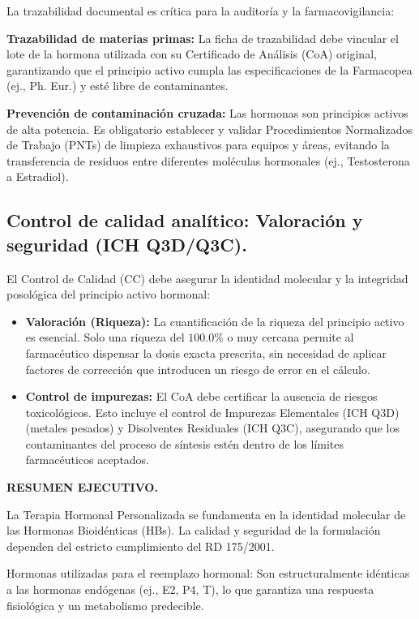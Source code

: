 \documentclass[
  spanish,
]{article}
\providecommand{\tightlist}{%
  \setlength{\itemsep}{0pt}\setlength{\parskip}{0pt}}
\begin{document}
La trazabilidad documental es crítica para la auditoría y la farmacovigilancia:

\textbf{Trazabilidad de materias primas:} La ficha de trazabilidad debe vincular el lote de la hormona utilizada con su Certificado de Análisis (CoA) original, garantizando que el principio activo cumpla las especificaciones de la Farmacopea (ej., Ph. Eur.) y esté libre de contaminantes.

\textbf{Prevención de contaminación cruzada:} Las hormonas son principios activos de alta potencia. Es obligatorio establecer y validar Procedimientos Normalizados de Trabajo (PNTs) de limpieza exhaustivos para equipos y áreas, evitando la transferencia de residuos entre diferentes moléculas hormonales (ej., Testosterona a Estradiol).

\subsection{Control de calidad analítico: Valoración y seguridad (ICH Q3D/Q3C).}\label{control-de-calidad-analuxedtico-valoraciuxf3n-y-seguridad-ich-q3dq3c.}

El Control de Calidad (CC) debe asegurar la identidad molecular y la integridad posológica del principio activo hormonal:

\begin{itemize}
\tightlist
\item
  \textbf{Valoración (Riqueza):} La cuantificación de la riqueza del principio activo es esencial. Solo una riqueza del \(\mathbf{100.0\%}\) o muy cercana permite al farmacéutico dispensar la dosis exacta prescrita, sin necesidad de aplicar factores de corrección que introducen un riesgo de error en el cálculo.
\item
  \textbf{Control de impurezas:} El CoA debe certificar la ausencia de riesgos toxicológicos. Esto incluye el control de Impurezas Elementales (ICH Q3D) (metales pesados) y Disolventes Residuales (ICH Q3C), asegurando que los contaminantes del proceso de síntesis estén dentro de los límites farmacéuticos aceptados.
\end{itemize}

\textbf{RESUMEN EJECUTIVO.}

La Terapia Hormonal Personalizada se fundamenta en la identidad molecular de las Hormonas Bioidénticas (HBs). La calidad y seguridad de la formulación dependen del estricto cumplimiento del RD 175/2001.

Hormonas utilizadas para el reemplazo hormonal: Son estructuralmente idénticas a las hormonas endógenas (ej., E2, P4, T), lo que garantiza una respuesta fisiológica y un metabolismo predecible.
\end{document}
